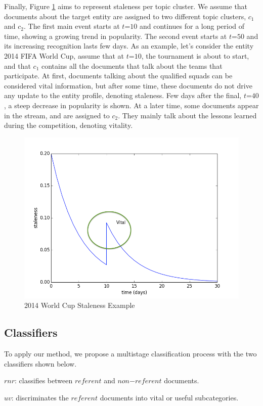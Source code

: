 \documentclass{article}
\begin{document}
Finally, Figure \ref{stalenessmedium} aims to represent staleness per topic cluster. We assume that documents about the target entity are assigned to two different topic clusters, $c_1$ and $c_2$. The first main event starts at $t\mathord{=}10$ and continues for a long period of time, showing a growing trend in popularity. The second event starts at $t\mathord{=}50$ and its increasing recognition lasts few days. As an example, let's consider the entity 2014 FIFA World Cup, assume that at $t\mathord{=}10$, the tournament is about to start, and that $c_1$ contains all the documents that talk about the teams that participate. At first, documents talking about the qualified squads can be considered vital information, but after some time, these documents do not drive any update to the entity profile, denoting staleness. Few days after the final, $t\mathord{=}40$, a steep decrease in popularity is shown. At a later time, some documents appear in the stream, and are assigned to $c_2$. They mainly talk about the lessons learned during the competition, denoting vitality.

\begin{figure}[h!]
\centering
\includegraphics[width=.5\textwidth]{staleness1.png}
\caption{2014 World Cup Staleness Example}
\label{stalenessmedium}
\end{figure}


\subsection{Classifiers}

To apply our method, we propose a multistage classification process with the two classifiers shown below.

\begin{itemize*}
    \item $rnr$: classifies between $referent$ and $non\mathord{-}referent$ documents.
    \item $uv$: discriminates the $referent$ documents into vital or useful subcategories.
\end{itemize*}
\end{document}

